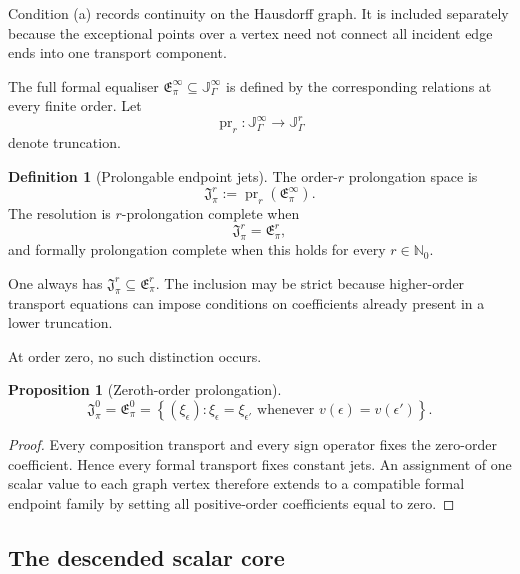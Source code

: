 \documentclass[11pt]{article}
\theoremstyle{plain}
\newtheorem{proposition}[theorem]{Proposition}
\theoremstyle{definition}
\newtheorem{definition}[theorem]{Definition}
\begin{document}
Condition \textup{(a)} records continuity on the Hausdorff graph. It is
included separately because the exceptional points over a vertex need
not connect all incident edge ends into one transport component.

The full formal equaliser \(\mathfrak E_\pi^\infty \subseteq \mathbb J_\Gamma^\infty\) is defined by the corresponding relations at every finite order. Let
\[
  \operatorname{pr}_r:
  \mathbb J_\Gamma^\infty
  \longrightarrow
  \mathbb J_\Gamma^r
\]
denote truncation.

\begin{definition}[Prolongable endpoint jets]
\label{def:prolongable-endpoint-jets}
The order-\(r\) prolongation space is
\[
  \boxed{
  \mathfrak J_\pi^r
  :=
  \operatorname{pr}_r
  \left(
    \mathfrak E_\pi^\infty
  \right).
  }
\]
The resolution is \(r\)-prolongation complete when
\[
  \mathfrak J_\pi^r
  =
  \mathfrak E_\pi^r,
\]
and formally prolongation complete when this holds for every
\(r\in\mathbb N_0\).
\end{definition}

One always has
\(\mathfrak J_\pi^r \subseteq \mathfrak E_\pi^r\).
The inclusion may be strict because higher-order transport equations
can impose conditions on coefficients already present in a lower
truncation.

At order zero, no such distinction occurs.

\begin{proposition}[Zeroth-order prolongation]
\label{prop:zeroth-order-prolongation}
\[
  \boxed{
  \mathfrak J_\pi^0
  =
  \mathfrak E_\pi^0
  =
  \left\{
    (\xi_\epsilon):
    \xi_\epsilon=\xi_{\epsilon'}
    \text{ whenever }
    v(\epsilon)=v(\epsilon')
  \right\}.
  }
\]
\end{proposition}

\begin{proof}
Every composition transport and every sign operator fixes the
zero-order coefficient. Hence every formal transport fixes constant
jets. An assignment of one scalar value to each graph vertex therefore
extends to a compatible formal endpoint family by setting all
positive-order coefficients equal to zero.
\end{proof}

\subsection{The descended scalar core}
\label{subsec:descended-scalar-core}
\end{document}
